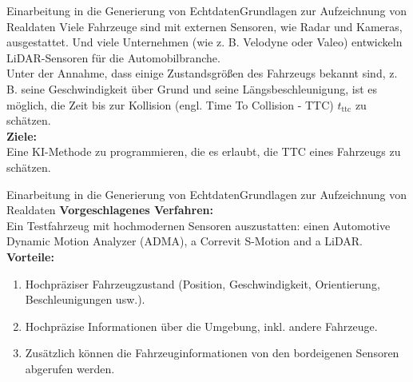 \documentclass[169, handout	]{THIbeamer} %
\begin{document}
	\begin{frame}{Einarbeitung in die Generierung von Echtdaten}{Grundlagen zur Aufzeichnung von Realdaten}
Viele Fahrzeuge sind mit externen Sensoren, wie Radar und Kameras, ausgestattet. Und viele Unternehmen (wie z. B. Velodyne oder Valeo) entwickeln LiDAR-Sensoren für die Automobilbranche.\\
Unter der Annahme, dass einige Zustandsgrößen des Fahrzeugs bekannt sind, z. B. seine Geschwindigkeit über Grund und seine Längsbeschleunigung, ist es möglich, die Zeit bis zur Kollision (engl. Time To Collision - TTC) $t_{\text{ttc}}$ zu schätzen.\\
		\textbf{Ziele:} \\
Eine KI-Methode zu programmieren, die es erlaubt, die TTC eines Fahrzeugs zu schätzen. 
	\end{frame}
\begin{frame}{Einarbeitung in die Generierung von Echtdaten}{Grundlagen zur Aufzeichnung von Realdaten}
	\textbf{Vorgeschlagenes Verfahren:} \\
	Ein Testfahrzeug mit hochmodernen Sensoren auszustatten: einen Automotive Dynamic Motion Analyzer (ADMA), a Correvit S-Motion and a LiDAR.
	\textbf{Vorteile:} \\
	\begin{enumerate}
		\item Hochpräziser Fahrzeugzustand (Position, Geschwindigkeit, Orientierung, Beschleunigungen usw.).
		\item Hochpräzise Informationen über die Umgebung, inkl. andere Fahrzeuge.
		\item Zusätzlich können die Fahrzeuginformationen von den bordeigenen Sensoren abgerufen werden.
	\end{enumerate}
\end{frame}
\end{document}
